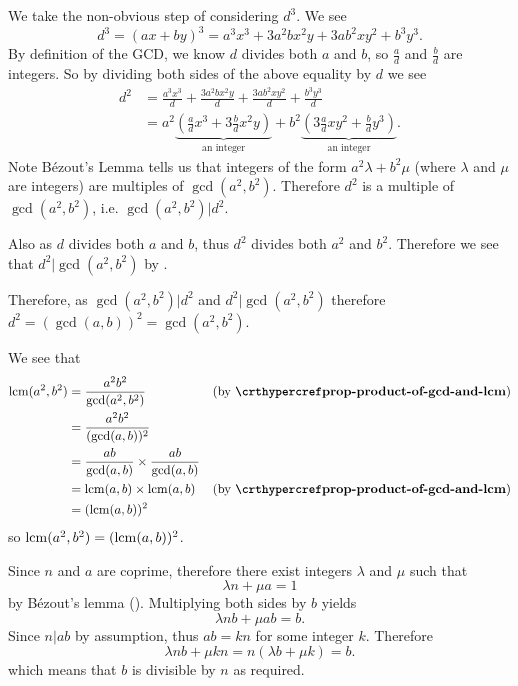 \begin{questions}
\begin{partquestions}{\roman*}
        We take the non-obvious step of considering $d^3$. We see
        \[
            d^3 = (ax+by)^3 = a^3x^3 + 3a^2bx^2y + 3ab^2xy^2 + b^3y^3.
        \]
        By definition of the GCD, we know $d$ divides both $a$ and $b$, so $\frac ad$ and $\frac bd$ are integers. So by dividing both sides of the above equality by $d$ we see
        \begin{align*}
            d^2 &= \frac{a^3x^3}{d} + \frac{3a^2bx^2y}{d} + \frac{3ab^2xy^2}{d} + \frac{b^3y^3}{d}\\
            &= a^2\underbrace{\left(\frac{a}{d}x^3 + 3\frac{b}{d}x^2y\right)}_{\text{an integer}} + b^2\underbrace{\left(3\frac{a}{d}xy^2 + \frac{b}{d}y^3\right)}_{\text{an integer}}.
        \end{align*}
        Note B\'{e}zout's Lemma tells us that integers of the form $a^2\lambda + b^2\mu$ (where $\lambda$ and $\mu$ are integers) are multiples of $\gcd(a^2, b^2)$. Therefore $d^2$ is a multiple of $\gcd(a^2, b^2)$, i.e. $\gcd(a^2, b^2) \vert d^2$.

        Also as $d$ divides both $a$ and $b$, thus $d^2$ divides both $a^2$ and $b^2$. Therefore we see that $d^2 \vert \gcd(a^2, b^2)$ by .

        Therefore, as $\gcd(a^2, b^2) \vert d^2$ and $d^2 \vert \gcd(a^2, b^2)$ therefore $d^2 = (\gcd(a,b))^2 = \gcd(a^2, b^2)$.

        \item We see that
        \begin{align*}
            \lcm(a^2,b^2) &= \frac{a^2b^2}{\gcd(a^2,b^2)} & (\text{by } \myref{prop-product-of-gcd-and-lcm})\\
            &= \frac{a^2b^2}{(\gcd(a,b))^2}\\
            &= \frac{ab}{\gcd(a,b)} \times \frac{ab}{\gcd(a,b)}\\
            &= \lcm(a,b) \times \lcm(a,b) & (\text{by } \myref{prop-product-of-gcd-and-lcm})\\
            &= (\lcm(a,b))^2
        \end{align*}
        so $\mathrm{lcm}(a^2,b^2) = (\mathrm{lcm}(a,b))^2$.
    \end{partquestions}

    \item Since $n$ and $a$ are coprime, therefore there exist integers $\lambda$ and $\mu$ such that
    \[
        \lambda n + \mu a = 1
    \]
    by B\'ezout's lemma (). Multiplying both sides by $b$ yields
    \[
        \lambda nb + \mu ab = b.
    \]
    Since $n \vert ab$ by assumption, thus $ab = kn$ for some integer $k$. Therefore
    \[
        \lambda nb + \mu kn = n(\lambda b + \mu k) = b.
    \]
    which means that $b$ is divisible by $n$ as required.


\end{questions}
